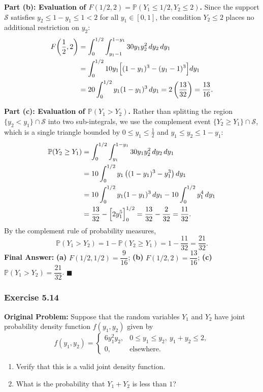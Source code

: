 \documentclass[11pt, letterpaper]{article}
\theoremstyle{definition}
\theoremstyle{remark}
\begin{document}
\textbf{Part (b): Evaluation of $F(1/2, 2) = \mathbb{P}(Y_1 \le 1/2, Y_2 \le 2)$.}
Since the support $\mathcal{S}$ satisfies $y_2 \le 1 - y_1 \le 1 < 2$ for all $y_1 \in [0, 1]$, the condition $Y_2 \le 2$ places no additional restriction on $y_2$:
\begin{align*}
    F\!\left(\frac{1}{2}, 2\right) &= \int_{0}^{1/2} \int_{y_1 - 1}^{1 - y_1} 30 y_1 y_2^2 \, dy_2 \, dy_1 \\
    &= \int_{0}^{1/2} 10 y_1 \Bigl[ (1 - y_1)^3 - (y_1 - 1)^3 \Bigr] dy_1 \\
    &= 20 \int_{0}^{1/2} y_1 (1 - y_1)^3 \, dy_1 = 2 \left( \frac{13}{32} \right) = \frac{13}{16}.
\end{align*}

\textbf{Part (c): Evaluation of $\mathbb{P}(Y_1 > Y_2)$.}
Rather than splitting the region $\{y_2 < y_1\} \cap \mathcal{S}$ into two sub-integrals, we use the complement event $\{Y_2 \ge Y_1\} \cap \mathcal{S}$, which is a single triangle bounded by $0 \le y_1 \le \frac{1}{2}$ and $y_1 \le y_2 \le 1 - y_1$:
\begin{align*}
    \mathbb{P}(Y_2 \ge Y_1) &= \int_{0}^{1/2} \int_{y_1}^{1 - y_1} 30 y_1 y_2^2 \, dy_2 \, dy_1 \\
    &= 10 \int_{0}^{1/2} y_1 \left( (1 - y_1)^3 - y_1^3 \right) dy_1 \\
    &= 10 \int_{0}^{1/2} y_1 (1 - y_1)^3 \, dy_1 - 10 \int_{0}^{1/2} y_1^4 \, dy_1 \\
    &= \frac{13}{32} - \Bigl[ 2 y_1^5 \Bigr]_{0}^{1/2} = \frac{13}{32} - \frac{2}{32} = \frac{11}{32}.
\end{align*}
By the complement rule of probability measures,
\[
    \mathbb{P}(Y_1 > Y_2) = 1 - \mathbb{P}(Y_2 \ge Y_1) = 1 - \frac{11}{32} = \frac{21}{32}.
\]
\textbf{Final Answer:} \textbf{(a)} $F(1/2, 1/2) = \dfrac{9}{16}$; \quad \textbf{(b)} $F(1/2, 2) = \dfrac{13}{16}$; \quad \textbf{(c)} $\mathbb{P}(Y_1 > Y_2) = \dfrac{21}{32}$. $\blacksquare$

\bigskip

\subsubsection*{Exercise 5.14}
\textbf{Original Problem:} Suppose that the random variables $Y_1$ and $Y_2$ have joint probability density function $f(y_1, y_2)$ given by
\[
    f(y_1, y_2) = \begin{cases}
        6 y_1^2 y_2, & 0 \le y_1 \le y_2,\ y_1 + y_2 \le 2, \\
        0, & \text{elsewhere.}
    \end{cases}
\]
\begin{enumerate}[label=\textbf{\alph*}]
    \item Verify that this is a valid joint density function.
    \item What is the probability that $Y_1 + Y_2$ is less than $1$?
\end{enumerate}
\end{document}
